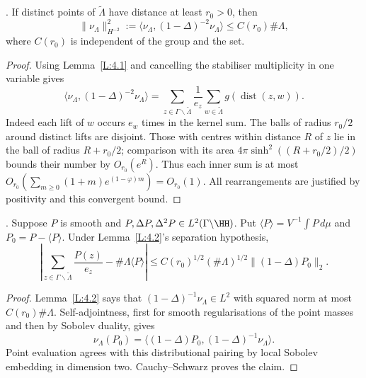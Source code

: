 \begin{lemma}\label{L:4.2}
. If distinct points of \(\widetilde\Lambda\) have distance
at least \(r_0>0\), then
\[
 \|\nu_\Lambda\|_{H^{-2}}^2
 :=\langle\nu_\Lambda,(1-\Delta)^{-2}\nu_\Lambda\rangle
 \le C(r_0)\#\Lambda,
\]
where \(C(r_0)\) is independent of the group and the set.
\end{lemma}
\begin{proof}
Using Lemma~\ref{L:4.1} and cancelling the stabiliser multiplicity in
one variable gives
\[
 \langle\nu_\Lambda,(1-\Delta)^{-2}\nu_\Lambda\rangle
 =\sum_{z\in\Gamma\backslash\widetilde\Lambda}\frac1{e_z}
       \sum_{w\in\widetilde\Lambda}g(\operatorname{dist}(z,w)).
\]
Indeed each lift of \(w\) occurs \(e_w\) times in the kernel sum.
The balls of radius \(r_0/2\) around distinct lifts are disjoint.
Those with centres within distance \(R\) of \(z\) lie in the ball of
radius \(R+r_0/2\); comparison with its area
\(4\pi\sinh^2((R+r_0/2)/2)\) bounds their number by \(O_{r_0}(e^R)\).
Thus each inner sum is at most
\(O_{r_0}(\sum_{m\ge0}(1+m)e^{(1-\varphi)m})=O_{r_0}(1)\).
All rearrangements are justified by positivity and this convergent bound.
\end{proof}

\begin{proposition}\label{L:4.3}
. Suppose \(P\) is smooth and
\(P,\Delta P,\Delta^2P\in L^2(\Gamma\backslash\HH)\). Put
\(\langle P\rangle=V^{-1}\int P\,d\mu\) and
\(P_0=P-\langle P\rangle\). Under Lemma~\ref{L:4.2}'s separation hypothesis,
\[
 \left|\sum_{z\in\Gamma\backslash\widetilde\Lambda}\frac{P(z)}{e_z}
           -\#\Lambda\langle P\rangle\right|
 \le C(r_0)^{1/2}(\#\Lambda)^{1/2}\|(1-\Delta)P_0\|_2.
\]
\end{proposition}
\begin{proof}
Lemma~\ref{L:4.2} says that \((1-\Delta)^{-1}\nu_\Lambda\in L^2\)
with squared norm at most \(C(r_0)\#\Lambda\). Self-adjointness, first
for smooth regularisations of the point masses and then by Sobolev
duality, gives
\[
 \nu_\Lambda(P_0)=
 \langle(1-\Delta)P_0,(1-\Delta)^{-1}\nu_\Lambda\rangle.
\]
Point evaluation agrees with this distributional pairing by local
Sobolev embedding in dimension two. Cauchy--Schwarz proves the claim.
\end{proof}

